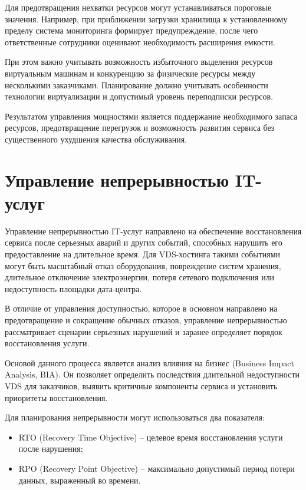 \documentclass[14pt,a4paper]{extarticle}
\begin{document}
Для предотвращения нехватки ресурсов могут устанавливаться пороговые значения.
Например, при приближении загрузки хранилища к установленному пределу система
мониторинга формирует предупреждение, после чего ответственные сотрудники
оценивают необходимость расширения емкости.

При этом важно учитывать возможность избыточного выделения ресурсов виртуальным
машинам и конкуренцию за физические ресурсы между несколькими заказчиками.
Планирование должно учитывать особенности технологии виртуализации и допустимый
уровень переподписки ресурсов.

Результатом управления мощностями является поддержание необходимого запаса
ресурсов, предотвращение перегрузок и возможность развития сервиса без
существенного ухудшения качества обслуживания.

\section{Управление непрерывностью IT-услуг}

Управление непрерывностью IT-услуг направлено на обеспечение восстановления
сервиса после серьезных аварий и других событий, способных нарушить его
предоставление на длительное время. Для VDS-хостинга такими событиями могут быть
масштабный отказ оборудования, повреждение систем хранения, длительное отключение
электроэнергии, потеря сетевого подключения или недоступность площадки дата-центра.

В отличие от управления доступностью, которое в основном направлено на
предотвращение и сокращение обычных отказов, управление непрерывностью
рассматривает сценарии серьезных нарушений и заранее определяет порядок
восстановления услуги.

Основой данного процесса является анализ влияния на бизнес (Business Impact
Analysis, BIA). Он позволяет определить последствия длительной недоступности VDS
для заказчиков, выявить критичные компоненты сервиса и установить приоритеты
восстановления.

Для планирования непрерывности могут использоваться два показателя:
\begin{itemize}
    \item RTO (Recovery Time Objective) -- целевое время восстановления услуги
    после нарушения;
    \item RPO (Recovery Point Objective) -- максимально допустимый период потери
    данных, выраженный во времени.
\end{itemize}
\end{document}
